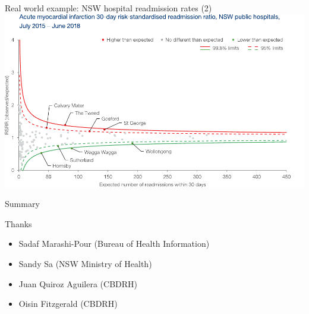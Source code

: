 \documentclass[aspectratio=169,12pt,usepdftitle=false]{beamer} %
\begin{document}
\begin{frame}{Real world example: NSW hospital readmission rates (2)}
\centering
\includegraphics[height=0.8\textheight]
	{ref/ami-rsrr.pdf}


\end{frame}

\begin{frame}{Summary}
\end{frame}

%
%
%
%










\begin{frame}{Thanks}
    \begin{itemize}
        \item Sadaf Marashi-Pour (Bureau of Health Information)
	\item Sandy Sa (NSW Ministry of Health)
	\item Juan Quiroz Aguilera (CBDRH)
	\item Oisin Fitzgerald (CBDRH)
    \end{itemize}
\end{frame}
\end{document}

